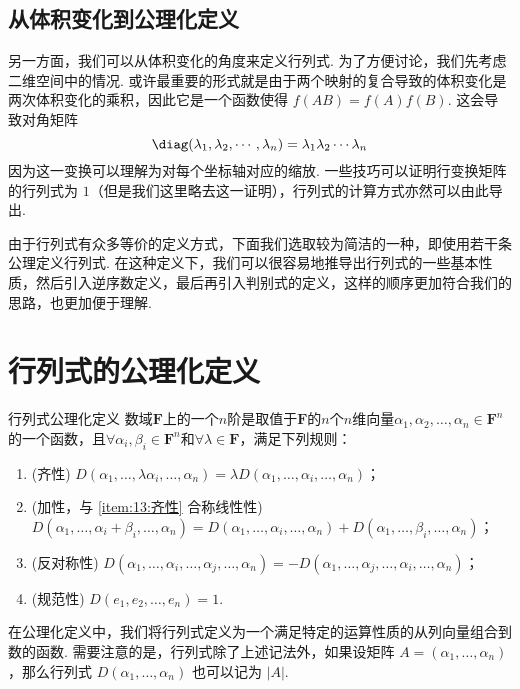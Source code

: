 \subsection{从体积变化到公理化定义}

另一方面，我们可以从体积变化的角度来定义行列式. 为了方便讨论，我们先考虑二维空间中的情况. 或许最重要的形式就是由于两个映射的复合导致的体积变化是两次体积变化的乘积，因此它是一个函数使得 $f(AB) = f(A)f(B)$. 这会导致对角矩阵
\[\diag(\lambda_1, \lambda_2, \cdots, \lambda_n) = \lambda_1\lambda_2\cdots\lambda_n\]
因为这一变换可以理解为对每个坐标轴对应的缩放. 一些技巧可以证明行变换矩阵的行列式为 $1$（但是我们这里略去这一证明），行列式的计算方式亦然可以由此导出.

由于行列式有众多等价的定义方式，下面我们选取较为简洁的一种，即使用若干条公理定义行列式. 在这种定义下，我们可以很容易地推导出行列式的一些基本性质，然后引入逆序数定义，最后再引入判别式的定义，这样的顺序更加符合我们的思路，也更加便于理解.

\section{行列式的公理化定义}

\begin{definition}{行列式}{公理化定义} 
    数域$\mathbf{F}$上的一个$n$阶是取值于$\mathbf{F}$的$n$个$n$维向量$\alpha_1,\alpha_2,\ldots,\alpha_n \in \mathbf{F}^n$的一个函数，且$\forall \alpha_i,\beta_i \in \mathbf{F}^n$和$\forall \lambda \in \mathbf{F}$，满足下列规则：
    \begin{enumerate}
        \item \label{item:13:齐性}
              (齐性) $D(\alpha_1,\ldots,\lambda\alpha_i,\ldots,\alpha_n)=\lambda D(\alpha_1,\ldots,\alpha_i,\ldots,\alpha_n)$；

        \item \label{item:13:加性}
              (加性，与 \ref*{item:13:齐性} 合称线性性) \\
              $D(\alpha_1,\ldots,\alpha_i+\beta_i,\ldots,\alpha_n)=D(\alpha_1,\ldots,\alpha_i,\ldots,\alpha_n)+D(\alpha_1,\ldots,\beta_i,\ldots,\alpha_n)$；

        \item \label{item:13:反对称性}
              (反对称性) $D(\alpha_1,\ldots,\alpha_i,\ldots,\alpha_j,\ldots,\alpha_n)=-D(\alpha_1,\ldots,\alpha_j,\ldots,\alpha_i,\ldots,\alpha_n)$；

        \item \label{item:13:规范性}
              (规范性) $D(e_1,e_2,\ldots,e_n)=1$.
    \end{enumerate}
\end{definition}
在公理化定义中，我们将行列式定义为一个满足特定的运算性质的从列向量组合到数的函数. 需要注意的是，行列式除了上述记法外，如果设矩阵 $A = (\alpha_1,\ldots,\alpha_n)$，那么行列式 $D(\alpha_1,\ldots,\alpha_n)$ 也可以记为 $|A|$.

